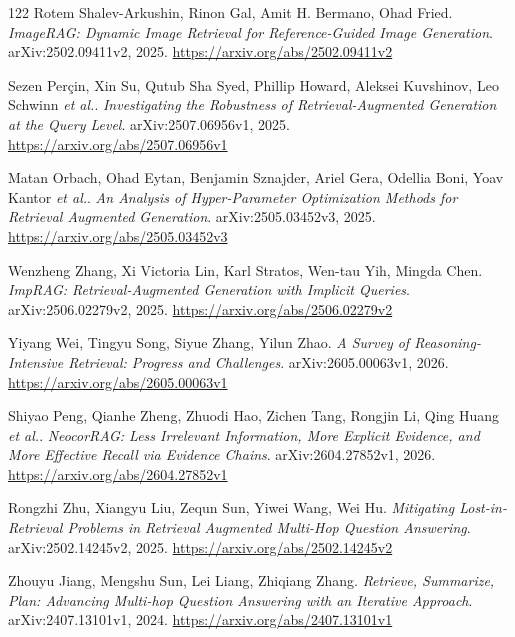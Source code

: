 \documentclass[11pt,a4paper]{article}
\begin{document}
\begin{thebibliography}{122}
Rotem Shalev-Arkushin, Rinon Gal, Amit H. Bermano, Ohad Fried.
\newblock \emph{ImageRAG: Dynamic Image Retrieval for Reference-Guided Image Generation}.
\newblock arXiv:2502.09411v2, 2025.
\newblock \url{https://arxiv.org/abs/2502.09411v2}

Sezen Per\c{c}in, Xin Su, Qutub Sha Syed, Phillip Howard, Aleksei Kuvshinov, Leo Schwinn \emph{et al.}.
\newblock \emph{Investigating the Robustness of Retrieval-Augmented Generation at the Query Level}.
\newblock arXiv:2507.06956v1, 2025.
\newblock \url{https://arxiv.org/abs/2507.06956v1}

Matan Orbach, Ohad Eytan, Benjamin Sznajder, Ariel Gera, Odellia Boni, Yoav Kantor \emph{et al.}.
\newblock \emph{An Analysis of Hyper-Parameter Optimization Methods for Retrieval Augmented Generation}.
\newblock arXiv:2505.03452v3, 2025.
\newblock \url{https://arxiv.org/abs/2505.03452v3}

Wenzheng Zhang, Xi Victoria Lin, Karl Stratos, Wen-tau Yih, Mingda Chen.
\newblock \emph{ImpRAG: Retrieval-Augmented Generation with Implicit Queries}.
\newblock arXiv:2506.02279v2, 2025.
\newblock \url{https://arxiv.org/abs/2506.02279v2}

Yiyang Wei, Tingyu Song, Siyue Zhang, Yilun Zhao.
\newblock \emph{A Survey of Reasoning-Intensive Retrieval: Progress and Challenges}.
\newblock arXiv:2605.00063v1, 2026.
\newblock \url{https://arxiv.org/abs/2605.00063v1}

Shiyao Peng, Qianhe Zheng, Zhuodi Hao, Zichen Tang, Rongjin Li, Qing Huang \emph{et al.}.
\newblock \emph{NeocorRAG: Less Irrelevant Information, More Explicit Evidence, and More Effective Recall via Evidence Chains}.
\newblock arXiv:2604.27852v1, 2026.
\newblock \url{https://arxiv.org/abs/2604.27852v1}

Rongzhi Zhu, Xiangyu Liu, Zequn Sun, Yiwei Wang, Wei Hu.
\newblock \emph{Mitigating Lost-in-Retrieval Problems in Retrieval Augmented Multi-Hop Question Answering}.
\newblock arXiv:2502.14245v2, 2025.
\newblock \url{https://arxiv.org/abs/2502.14245v2}

Zhouyu Jiang, Mengshu Sun, Lei Liang, Zhiqiang Zhang.
\newblock \emph{Retrieve, Summarize, Plan: Advancing Multi-hop Question Answering with an Iterative Approach}.
\newblock arXiv:2407.13101v1, 2024.
\newblock \url{https://arxiv.org/abs/2407.13101v1}


\end{thebibliography}
\end{document}
